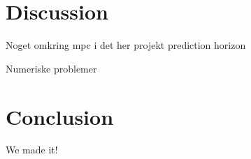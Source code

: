 \chapter{Discussion}\label{ch:discussion}

Noget omkring mpc i det her projekt
	prediction horizon
	
Numeriske problemer 


\chapter{Conclusion}\label{ch:conclusion}

We made it!


